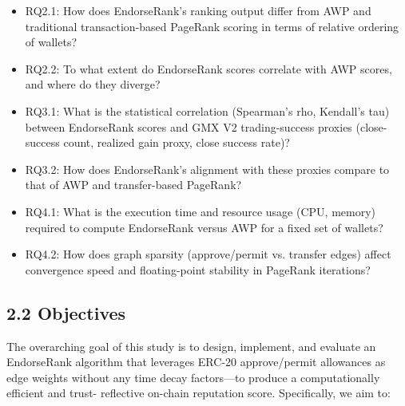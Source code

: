 \begin{itemize}
\item[\textendash] RQ2.1: How does EndorseRank's ranking output differ from AWP and traditional transaction-based PageRank scoring in terms of relative ordering of wallets?
\item[\textendash] RQ2.2: To what extent do EndorseRank scores correlate with AWP scores, and where do they diverge?
\end{itemize}

\begin{itemize}
\item[\textendash] RQ3.1: What is the statistical correlation (Spearman's rho, Kendall's tau) between EndorseRank scores and GMX V2 trading-success proxies (close-success count, realized gain proxy, close success rate)?
\item[\textendash] RQ3.2: How does EndorseRank's alignment with these proxies compare to that of AWP and transfer-based PageRank?
\end{itemize}

\begin{itemize}
\item[\textendash] RQ4.1: What is the execution time and resource usage (CPU, memory) required to compute EndorseRank versus AWP for a fixed set of wallets?
\item[\textendash] RQ4.2: How does graph sparsity (approve/permit vs. transfer edges) affect convergence speed and floating-point stability in PageRank iterations?
\end{itemize}
\subsection*{2.2 Objectives}
\label{sec:objectives}

The overarching goal of this study is to design, implement, and evaluate an EndorseRank algorithm that leverages ERC-20 approve/permit allowances as edge weights without any time decay factors---to produce a computationally efficient and trust- reflective on-chain reputation score. Specifically, we aim to:



